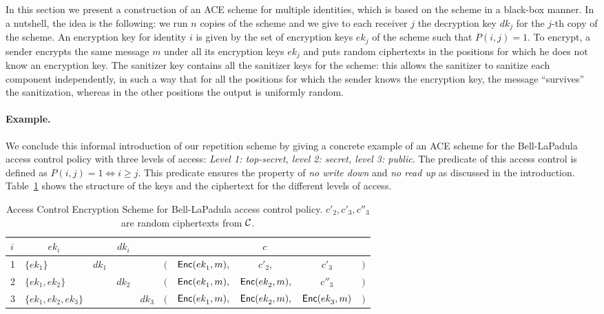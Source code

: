 \documentclass{llncs}
\begin{document}
In this section we  present a construction of an ACE scheme for multiple identities, which is based on the \oACE scheme in a black-box manner. In a nutshell, the idea is the following: we run $n$ copies of the \oACE scheme and we give to each receiver $j$ the decryption key $dk_j$ for the $j$-th copy of the scheme. An encryption key for identity $i$ is given by the set of encryption keys $ek_j$ of the \oACE scheme such that $P(i,j)=1$. To encrypt, a sender encrypts the same message $m$ under all its encryption keys $ek_j$ and puts random ciphertexts in the positions for which he does not know an encryption key. The sanitizer key contains all the sanitizer keys for the \oACE scheme: this allows the sanitizer to sanitize each component independently, in such a way that for all the positions for which the sender knows the encryption key, the message ``survives'' the sanitization, whereas in the other positions the output is uniformly random.

\paragraph{Example.} We conclude this informal introduction of our repetition scheme by giving a concrete example of an ACE scheme for the Bell-LaPadula access control policy with three levels of access: \textit{Level 1: top-secret, level 2: secret, level 3: public}.
The predicate of this access control is defined as $P(i,j) = 1 \Leftrightarrow i \geq j$. This predicate ensures the property of \textit{no write down} and \textit{no read up} as discussed in the introduction.
Table~\ref{table:BL_ACE} shows the structure of the keys and the ciphertext for the different levels of access.

\renewcommand{\oneACE}{}
\renewcommand{\oneACEpow}{{}}
\begin{table}
\centering
\begin{tabular}{l|l|ccc|ccccc}
$i$		&	\multicolumn{1}{|c|}{$ek_i$}	
		&	\multicolumn{3}{|c}{$dk_i$}	
		&	\multicolumn{5}{|c}{$c$}		\\ \hline
		
1		&	$\{ek_1^\oneACEpow \}$						
		&	$dk_1^\oneACEpow$	
&&&	$($&$ \Enc(ek_1^\oneACEpow, m),$&$c'_2,$&$ c'_3 $&$)$ \\
		
2		&	$\{ek_1^\oneACEpow, ek_2^\oneACEpow \}$				
		&&	$dk_2^\oneACEpow$	
&&	$($&$ \Enc(ek_1^\oneACEpow, m),$&$ \Enc(ek_2^\oneACEpow, m),$&$ c''_3 $&$)$ \\
		
3		&	$\{ek_1^\oneACEpow, ek_2^\oneACEpow, ek_3^\oneACEpow \}$			
		&&&	$dk_3^\oneACEpow$	
&	$($&$ \Enc(ek_1^\oneACEpow, m),$&$ \Enc(ek_2^\oneACEpow, m),$&$ \Enc(ek_3^\oneACEpow, m) $&$)$ \\
\end{tabular}
\newline
\caption{Access Control Encryption Scheme for Bell-LaPadula access control policy. $c'_2,c'_3,c''_3$ are random ciphertexts from $\mathcal{C}$.}
\label{table:BL_ACE}
\end{table}
\renewcommand{\oneACE}{\mathsf{1ACE}}
\renewcommand{\oneACEpow}{\mathsf{1ACE}}
\end{document}
